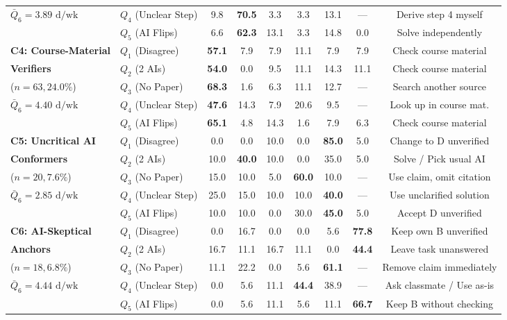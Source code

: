 \documentclass[11pt,a4paper]{article}
\begin{document}
\begin{table}[H]
{\begin{tabular}{llccccccc}
$\bar{Q}_6 = 3.89\text{ d/wk}$ & $Q_4$ (Unclear Step) & 9.8 & \textbf{70.5} & 3.3 & 3.3 & 13.1 & --- & Derive step 4 myself \\
 & $Q_5$ (AI Flips) & 6.6 & \textbf{62.3} & 13.1 & 3.3 & 14.8 & 0.0 & Solve independently \\
\midrule
\textbf{C4: Course-Material} & $Q_1$ (Disagree) & \textbf{57.1} & 7.9 & 7.9 & 11.1 & 7.9 & 7.9 & Check course material \\
\textbf{Verifiers} & $Q_2$ (2 AIs) & \textbf{54.0} & 0.0 & 9.5 & 11.1 & 14.3 & 11.1 & Check course material \\
($n = 63, 24.0\%$) & $Q_3$ (No Paper) & \textbf{68.3} & 1.6 & 6.3 & 11.1 & 12.7 & --- & Search another source \\
$\bar{Q}_6 = 4.40\text{ d/wk}$ & $Q_4$ (Unclear Step) & \textbf{47.6} & 14.3 & 7.9 & 20.6 & 9.5 & --- & Look up in course mat. \\
 & $Q_5$ (AI Flips) & \textbf{65.1} & 4.8 & 14.3 & 1.6 & 7.9 & 6.3 & Check course material \\
\midrule
\textbf{C5: Uncritical AI} & $Q_1$ (Disagree) & 0.0 & 0.0 & 10.0 & 0.0 & \textbf{85.0} & 5.0 & Change to D unverified \\
\textbf{Conformers} & $Q_2$ (2 AIs) & 10.0 & \textbf{40.0} & 10.0 & 0.0 & 35.0 & 5.0 & Solve / Pick usual AI \\
($n = 20, 7.6\%$) & $Q_3$ (No Paper) & 15.0 & 10.0 & 5.0 & \textbf{60.0} & 10.0 & --- & Use claim, omit citation \\
$\bar{Q}_6 = 2.85\text{ d/wk}$ & $Q_4$ (Unclear Step) & 25.0 & 15.0 & 10.0 & 10.0 & \textbf{40.0} & --- & Use unclarified solution \\
 & $Q_5$ (AI Flips) & 10.0 & 10.0 & 0.0 & 30.0 & \textbf{45.0} & 5.0 & Accept D unverified \\
\midrule
\textbf{C6: AI-Skeptical} & $Q_1$ (Disagree) & 0.0 & 16.7 & 0.0 & 0.0 & 5.6 & \textbf{77.8} & Keep own B unverified \\
\textbf{Anchors} & $Q_2$ (2 AIs) & 16.7 & 11.1 & 16.7 & 11.1 & 0.0 & \textbf{44.4} & Leave task unanswered \\
($n = 18, 6.8\%$) & $Q_3$ (No Paper) & 11.1 & 22.2 & 0.0 & 5.6 & \textbf{61.1} & --- & Remove claim immediately \\
$\bar{Q}_6 = 4.44\text{ d/wk}$ & $Q_4$ (Unclear Step) & 0.0 & 5.6 & 11.1 & \textbf{44.4} & 38.9 & --- & Ask classmate / Use as-is \\
 & $Q_5$ (AI Flips) & 0.0 & 5.6 & 11.1 & 5.6 & 11.1 & \textbf{66.7} & Keep B without checking \\
\bottomrule
\end{tabular}%
}
\end{table}
\end{document}
